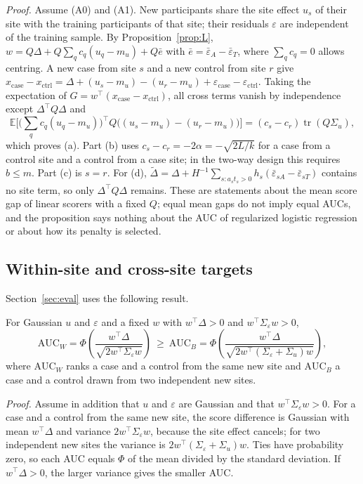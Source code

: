 \emph{Proof.} Assume (A0) and (A1). New participants share the site effect $u_s$ of their site with the training participants of that site; their residuals $\varepsilon$ are independent of the training sample. By Proposition~\ref{prop:L}, $w=Q\Delta+Q\sum_qc_q(u_q-m_u)+Q\bar e$ with $\bar e=\bar\varepsilon_A-\bar\varepsilon_T$, where $\sum_qc_q=0$ allows centring. A new case from site $s$ and a new control from site $r$ give $x_{\mathrm{case}}-x_{\mathrm{ctrl}}=\Delta+(u_s-m_u)-(u_r-m_u)+\varepsilon_{\mathrm{case}}-\varepsilon_{\mathrm{ctrl}}$. Taking the expectation of $G=w^\top(x_{\mathrm{case}}-x_{\mathrm{ctrl}})$, all cross terms vanish by independence except $\Delta^\top Q\Delta$ and
\[
\mathbb{E}\Big[\Big(\sum_qc_q(u_q-m_u)\Big)^{\!\top}Q\big((u_s-m_u)-(u_r-m_u)\big)\Big]=(c_s-c_r)\operatorname{tr}(Q\Sigma_u),
\]
which proves (a). Part (b) uses $c_s-c_r=-2\alpha=-\sqrt{2L/k}$ for a case from a control site and a control from a case site; in the two-way design this requires $b\le m$. Part (c) is $s=r$. For (d), $\tilde\Delta=\Delta+H^{-1}\sum_{s:a_st_s>0}h_s(\bar\varepsilon_{sA}-\bar\varepsilon_{sT})$ contains no site term, so only $\Delta^\top Q\Delta$ remains. These are statements about the mean score gap of linear scorers with a fixed $Q$; equal mean gaps do not imply equal AUCs, and the proposition says nothing about the AUC of regularized logistic regression or about how its penalty is selected.

\subsection{Within-site and cross-site targets}

Section~\ref{sec:eval} uses the following result.

\begin{proposition}\label{prop:targets}
For Gaussian $u$ and $\varepsilon$ and a fixed $w$ with $w^\top\Delta>0$ and $w^\top\Sigma_\varepsilon w>0$,
\begin{equation}
\mathrm{AUC}_W=\Phi\!\left(\frac{w^\top\Delta}{\sqrt{2w^\top\Sigma_\varepsilon w}}\right)\ \ge\
\mathrm{AUC}_B=\Phi\!\left(\frac{w^\top\Delta}{\sqrt{2w^\top(\Sigma_\varepsilon+\Sigma_u)w}}\right),\label{eq:targets}
\end{equation}
where $\mathrm{AUC}_W$ ranks a case and a control from the same new site and $\mathrm{AUC}_B$ a case and a control drawn from two independent new sites.
\end{proposition}

\emph{Proof.} Assume in addition that $u$ and $\varepsilon$ are Gaussian and that $w^\top\Sigma_\varepsilon w>0$. For a case and a control from the same new site, the score difference is Gaussian with mean $w^\top\Delta$ and variance $2w^\top\Sigma_\varepsilon w$, because the site effect cancels; for two independent new sites the variance is $2w^\top(\Sigma_\varepsilon+\Sigma_u)w$. Ties have probability zero, so each AUC equals $\Phi$ of the mean divided by the standard deviation. If $w^\top\Delta>0$, the larger variance gives the smaller AUC.

